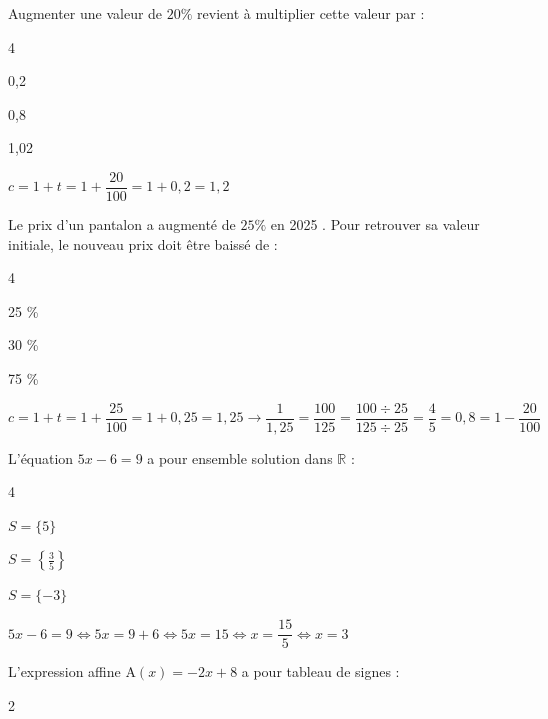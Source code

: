\documentclass[11pt,a4paper]{article}  %
\begin{document}
\begin{enumMet}
	\item Augmenter une valeur de $20 \%$ revient à multiplier cette valeur par :
	\begin{multicols}{4}
	\begin{enumMet}
		\item 	0,2
		\item 0,8
		\item {}
		\item 1,02
	\end{enumMet}
	\end{multicols}
	\begin{corrBox}
		$c=1+t=1+\dfrac{20}{100}=1+0,2=1,2$		
	\end{corrBox}
	\item Le prix d'un pantalon a augmenté de $25 \%$ en 2025 . Pour retrouver sa valeur initiale, le nouveau prix doit être baissé de :
	\begin{multicols}{4}
		\begin{enumMet}
		\item \fbox{20 \%}
		\item 25 \%
		\item 30 \%
		\item 75 \%
	\end{enumMet}
	\end{multicols}
	\begin{corrBox}
		$c=1+t=1+\dfrac{25}{100}=1+0,25=1,25\longrightarrow\dfrac{1}{1,25}=\dfrac{100}{125}=\dfrac{100\div25}{125\div25}=\dfrac{4}{5}=0,8=1-\dfrac{20}{100}$		
	\end{corrBox}
	\item L'équation $5 x-6=9$ a pour ensemble solution dans $\mathbb{R}$ :
	\begin{multicols}{4}
		\begin{enumMet}
			\item $S=\{5\}$
			\item \fbox{$S=\{3\}$}
			\item $S=\left\{\frac{3}{5}\right\}$
			\item $S=\{-3\}$
		\end{enumMet}
	\end{multicols}
	\begin{corrBox}
		$5 x-6=9\iff 5x=9+6\iff 5x=15\iff x=\dfrac{15}{5}\iff x=3$		
	\end{corrBox}
	\item L'expression affine $\mathrm{A}(x)=-2 x+8$ a pour tableau de signes :
	\begin{multicols}{2}

\end{multicols}
\end{enumMet}
\end{document}
